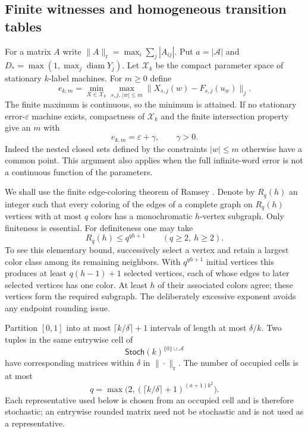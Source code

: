 \subsection{Finite witnesses and homogeneous transition tables}
For a matrix $A$ write $\|A\|_{\mathrm r}=\max_i\sum_j|A_{ij}|$. Put $a=|\mathcal A|$ and $D_* =\max(1,\max_j\operatorname{diam}Y_j)$. Let $\mathcal X_k$ be the compact parameter space of stationary $k$-label machines. For $m\ge0$ define
\[
 e_{k,m}=\min_{X\in\mathcal X_k}\max_{s,j,\,|w|\le m}
               \|X_{s,j}(w)-F_{s,j}(u_w)\|_j.
\]
The finite maximum is continuous, so the minimum is attained. If no stationary error-$\varepsilon$ machine exists, compactness of $\mathcal X_k$ and the finite intersection property give an $m$ with
\begin{equation}\label{eq:finitewitness56}
                       e_{k,m}=\varepsilon+\gamma,\qquad\gamma>0.
\end{equation}
Indeed the nested closed sets defined by the constraints $|w|\le m$ otherwise have a common point. This argument also applies when the full infinite-word error is not a continuous function of the parameters.

We shall use the finite edge-coloring theorem of Ramsey \cite{Ramsey}. Denote by $R_q(h)$ an integer such that every coloring of the edges of a complete graph on $R_q(h)$ vertices with at most $q$ colors has a monochromatic $h$-vertex subgraph. Only finiteness is essential. For definiteness one may take
\begin{equation}\label{eq:ramseybound56}
                   R_q(h)\le q^{qh+1}\qquad(q\ge2,\ h\ge2).
\end{equation}
To see this elementary bound, successively select a vertex and retain a largest color class among its remaining neighbors. With $q^{qh+1}$ initial vertices this produces at least $q(h-1)+1$ selected vertices, each of whose edges to later selected vertices has one color. At least $h$ of their associated colors agree; these vertices form the required subgraph. The deliberately excessive exponent avoids any endpoint rounding issue.

Partition $[0,1]$ into at most $\lceil k/\delta\rceil+1$ intervals of length at most $\delta/k$. Two tuples in the same entrywise cell of
\[
                  \mathsf{Stoch}(k)^{\{0\}\cup\mathcal A}
\]
have corresponding matrices within $\delta$ in $\|\cdot\|_{\mathrm r}$. The number of occupied cells is at most
\begin{equation}\label{eq:colors56}
             q=\max\bigl(2,(\lceil k/\delta\rceil+1)^{(a+1)k^2}\bigr).
\end{equation}
Each representative used below is chosen from an occupied cell and is therefore stochastic; an entrywise rounded matrix need not be stochastic and is not used as a representative.

